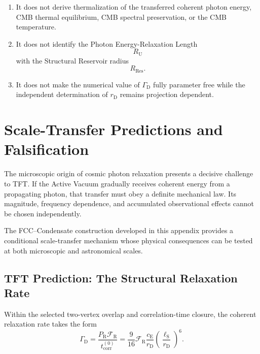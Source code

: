 \begin{enumerate}
    \item It does not derive thermalization of the transferred coherent
    photon energy, CMB thermal equilibrium, CMB spectral preservation, or the
    CMB temperature.

    \item It does not identify the Photon Energy-Relaxation Length
    \begin{equation}
        R_{\mathrm U}
    \end{equation}
    with the Structural Reservoir radius
    \begin{equation}
        R_{\mathrm{Res}}.
    \end{equation}

    \item It does not make the numerical value of
    $\Gamma_{\mathrm D}$
    fully parameter free while the independent determination of
    $r_{\mathrm D}$ remains projection dependent.
\end{enumerate}


\section{Scale-Transfer Predictions and Falsification}
\label{sec:AT_predictions_falsification}

The microscopic origin of cosmic photon relaxation presents
a decisive challenge to TFT. If the Active Vacuum gradually
receives coherent energy from a propagating photon, that
transfer must obey a definite mechanical law. Its magnitude,
frequency dependence, and accumulated observational effects
cannot be chosen independently.

The FCC--Condensate construction developed in this appendix
provides a conditional scale-transfer mechanism whose
physical consequences can be tested at both microscopic
and astronomical scales.

\subsection*{TFT Prediction: The Structural Relaxation Rate}

Within the selected two-vertex overlap and correlation-time
closure, the coherent relaxation rate takes the form
\begin{equation}
\Gamma_{\mathrm D}
=
\frac{P_{\mathrm R}\mathcal F_{\mathrm R}}
{t_{\mathrm{corr}}^{(0)}}
=
\frac{9}{16}\mathcal F_{\mathrm R}
\frac{c_{\mathrm E}}{r_{\mathrm D}}
\left(\frac{\ell_{\mathrm S}}{r_{\mathrm D}}\right)^6.
\end{equation}

